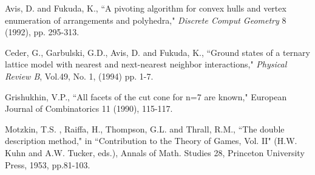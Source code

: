 \addtolength{\baselineskip}{-0.5\baselineskip}
\begin{thebibliography}{99}
 Avis, D.  and Fukuda, K., ``A pivoting algorithm
        for convex hulls and vertex enumeration of arrangements
        and polyhedra," {\em Discrete Comput Geometry} 8
        (1992), pp. 295-313.

 Ceder, G., Garbulski, G.D.,  Avis, D. and Fukuda, K., 
``Ground states of a ternary lattice model with nearest
and next-nearest neighbor interactions,"
{\em Physical Review B\/}, Vol.49, No. 1, (1994)  pp. 1-7.

 Grishukhin, V.P., ``All facets of
the cut cone for n=7 are known," European Journal of
Combinatorics 11 (1990), 115-117.

 Motzkin, T.S. , Raiffa, H.,  
Thompson, G.L. and  Thrall, R.M., ``The double description method," 
in  ``Contribution to the Theory of Games, Vol. II"
(H.W. Kuhn and A.W. Tucker, eds.),
Annals of Math. Studies 28,  Princeton University Press, 1953, pp.81-103.

\end{thebibliography}



